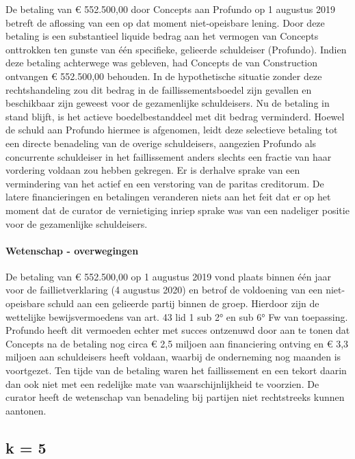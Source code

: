 \documentclass[
  dutch,
  a4paper,
]{article}
\begin{document}
De betaling van € 552.500,00 door Concepts aan Profundo op 1 augustus 2019 betreft de aflossing van een op dat moment niet-opeisbare lening. Door deze betaling is een substantieel liquide bedrag aan het vermogen van Concepts onttrokken ten gunste van één specifieke, gelieerde schuldeiser (Profundo). Indien deze betaling achterwege was gebleven, had Concepts de van Construction ontvangen € 552.500,00 behouden. In de hypothetische situatie zonder deze rechtshandeling zou dit bedrag in de faillissementsboedel zijn gevallen en beschikbaar zijn geweest voor de gezamenlijke schuldeisers. Nu de betaling in stand blijft, is het actieve boedelbestanddeel met dit bedrag verminderd. Hoewel de schuld aan Profundo hiermee is afgenomen, leidt deze selectieve betaling tot een directe benadeling van de overige schuldeisers, aangezien Profundo als concurrente schuldeiser in het faillissement anders slechts een fractie van haar vordering voldaan zou hebben gekregen. Er is derhalve sprake van een vermindering van het actief en een verstoring van de paritas creditorum. De latere financieringen en betalingen veranderen niets aan het feit dat er op het moment dat de curator de vernietiging inriep sprake was van een nadeliger positie voor de gezamenlijke schuldeisers.

\paragraph{Wetenschap - overwegingen}\label{wetenschap---overwegingen-38}

De betaling van € 552.500,00 op 1 augustus 2019 vond plaats binnen één jaar voor de faillietverklaring (4 augustus 2020) en betrof de voldoening van een niet-opeisbare schuld aan een gelieerde partij binnen de groep. Hierdoor zijn de wettelijke bewijsvermoedens van art. 43 lid 1 sub 2° en sub 6° Fw van toepassing. Profundo heeft dit vermoeden echter met succes ontzenuwd door aan te tonen dat Concepts na de betaling nog circa € 2,5 miljoen aan financiering ontving en € 3,3 miljoen aan schuldeisers heeft voldaan, waarbij de onderneming nog maanden is voortgezet. Ten tijde van de betaling waren het faillissement en een tekort daarin dan ook niet met een redelijke mate van waarschijnlijkheid te voorzien. De curator heeft de wetenschap van benadeling bij partijen niet rechtstreeks kunnen aantonen.

\newpage


\subsection{k = 5}\label{k-5-4}
\end{document}
